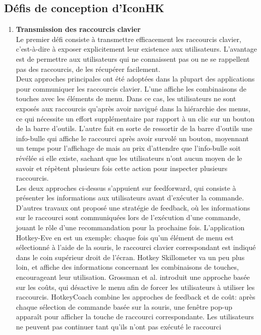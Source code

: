 \documentclass[12pt,a4paper]{article}
\newcommand\tab[1][0.65cm]{\hspace*{#1}}
\begin{document}
\subsection{Défis de conception d'IconHK}
\begin{enumerate}
\item {\large \textbf{Transmission des raccourcis clavier}}\\
Le premier défi consiste à transmettre efficacement les raccourcis clavier, c'est-à-dire à exposer explicitement leur existence aux utilisateurs. L'avantage est de permettre aux utilisateurs qui ne connaissent pas ou ne se rappellent pas des raccourcis, de les récupérer facilement.\\
\tab Deux approches principales ont été adoptées dans la plupart des applications pour communiquer les raccourcis clavier. L'une affiche les combinaisons de touches avec les éléments de menu. Dans ce cas, les utilisateurs ne sont exposés aux raccourcis qu'après avoir navigué dans la hiérarchie des
menus, ce qui nécessite un effort supplémentaire par rapport à un clic sur un bouton de la barre d'outils. L'autre fait en sorte de ressortir de la barre d'outils une info-bulle qui affiche le raccourci
après avoir survolé un bouton, moyennant un temps pour l’affichage de mais au prix d'attendre que l'info-bulle soit révélée si elle existe, sachant que les utilisateurs n'ont aucun moyen de le savoir et
répètent plusieurs fois cette action pour inspecter plusieurs raccourcis.\\
\tab Les deux approches ci-dessus s'appuient sur feedforward, qui consiste à présenter les informations aux utilisateurs avant d'exécuter la commande.\\
\tab D'autres travaux ont proposé une stratégie de feedback, où les informations sur le raccourci sont communiquées lors de l'exécution d'une commande, jouant le rôle d'une recommandation pour la prochaine fois. L'application Hotkey-Eve \cite{4} en est un exemple: chaque fois qu'un élément de menu
est sélectionné à l'aide de la souris, le raccourci clavier correspondant est indiqué dans le coin supérieur droit de l'écran. Hotkey Skillometer \cite{5} va un peu plus loin, et affiche des informations
concernant les combinaisons de touches, encourageant leur utilisation. Grossman et al. introduit une approche basée sur les coûts, qui désactive le menu afin de forcer les utilisateurs à utiliser les raccourcis. HotkeyCoach \cite{6} combine les approches de feedback et de coût: après chaque sélection de commande basée sur la souris, une fenêtre pop-up apparaît pour afficher la touche de raccourci correspondante. Les utilisateurs ne peuvent pas continuer tant qu'ils n'ont pas exécuté le raccourci

\end{enumerate}
\end{document}
